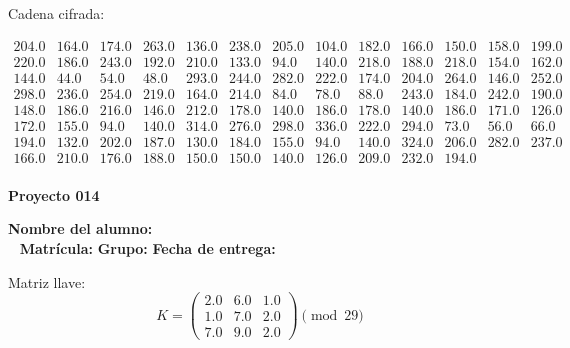 \documentclass[12pt]{article}
\begin{document}
Cadena cifrada:
\begin{center}
$\begin{array}{lllllllllllll}
204.0 & 164.0 & 174.0 & 263.0 & 136.0 & 238.0 & 205.0 & 104.0 & 182.0 & 166.0 & 150.0 & 158.0 & 199.0\\
220.0 & 186.0 & 243.0 & 192.0 & 210.0 & 133.0 & 94.0 & 140.0 & 218.0 & 188.0 & 218.0 & 154.0 & 162.0\\
144.0 & 44.0 & 54.0 & 48.0 & 293.0 & 244.0 & 282.0 & 222.0 & 174.0 & 204.0 & 264.0 & 146.0 & 252.0\\
298.0 & 236.0 & 254.0 & 219.0 & 164.0 & 214.0 & 84.0 & 78.0 & 88.0 & 243.0 & 184.0 & 242.0 & 190.0\\
148.0 & 186.0 & 216.0 & 146.0 & 212.0 & 178.0 & 140.0 & 186.0 & 178.0 & 140.0 & 186.0 & 171.0 & 126.0\\
172.0 & 155.0 & 94.0 & 140.0 & 314.0 & 276.0 & 298.0 & 336.0 & 222.0 & 294.0 & 73.0 & 56.0 & 66.0\\
194.0 & 132.0 & 202.0 & 187.0 & 130.0 & 184.0 & 155.0 & 94.0 & 140.0 & 324.0 & 206.0 & 282.0 & 237.0\\
166.0 & 210.0 & 176.0 & 188.0 & 150.0 & 150.0 & 140.0 & 126.0 & 209.0 & 232.0 & 194.0\\
\end{array}$
\end{center}

\newpage


\textbf{Proyecto 014}

\textbf{Nombre del alumno:} \underline{\hspace{13cm}}\\\
\vspace{1cm}
\textbf{Matrícula:} \underline{\hspace{4cm}} \hspace{1cm}
\textbf{Grupo:} \underline{\hspace{2cm}}
\textbf{Fecha de entrega:} \underline{\hspace{2cm}}

\medskip

Matriz llave:
\[
K = \begin{pmatrix}
2.0 & 6.0 & 1.0\\
1.0 & 7.0 & 2.0\\
7.0 & 9.0 & 2.0
\end{pmatrix} \pmod{29}
\]
\end{document}
